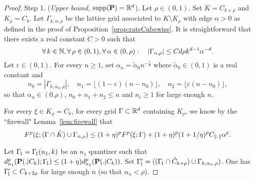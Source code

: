 \begin{proof} {\sc Step 1.}
 ({\em Upper bound}, ${\rm supp}(\mathbf{P})= \mathbb{R}^d$). Let
$\rho\!\in(0,1)$. Set $K=C_{k+\rho}$ and $K_{\rho}= C_k$. Let
$\Gamma_{k,\alpha,\rho}$ be the lattice grid associated to $K\setminus K_{\rho}$
with edge $\alpha>0$ as defined  in the proof of Proposition~\ref{prop:rateCubewise}.
It is straightforward that there exists a real constant $C>0$ such that
\[
\forall\, k\in\mathbb{N}, \forall\, \rho\in(0,1), \forall\,\alpha\in(0,\rho):\quad
|\Gamma_{\alpha,\rho}|\le C d\rho k^{d-1}\alpha^{-d}  .
\] 
Let $\varepsilon\!\in (0,1)$. For every $n\ge 1$, set $\alpha_n = \tilde
\alpha_0 n^{-\frac 1d}$ where $\tilde \alpha_0\in(0,1)$ is a real constant and
\[ 
n_0= |\Gamma_{k,\alpha_n,\rho}|,\quad n_1=\lfloor
(1-\varepsilon)(n-n_0)\rfloor,\quad n_2= \lfloor \varepsilon (n-n_0)\rfloor, 
\]
so that $\alpha_n\in(0.\rho)$, $n_0+n_1+n_2\le n$ and $n_i\ge1$ for large enough
$n$. 

\smallskip For every $\xi\!\in K_{\rho}=C_k$, for every grid $\Gamma\subset
\mathbb{R}^d$ containing $K_{\rho}$, we know by the ``firewall" 
Lemma~\ref{lem:firewall} that
\[ 
F^p(\xi;(\Gamma\cap
\mathring{K})\cup\Gamma_{\alpha,\rho})\le (1+\eta)^p F^p(\xi;\Gamma)
+(1+\eta)^p(1+1/\eta)^pC_{\lVert.\rVert}\alpha^p. 
\]

Let $\Gamma_{\!1}=\Gamma_{\!1}(n_1,k)$ be an $n_1$ quantizer such that
$d^p_{n_1}(\mathbf{P}(.|C_k); \Gamma_{\!1}) \leq (1+\eta) d^p_{n_1}(\mathbf{P}(.|C_k))$.
Set $\Gamma_{\!1}'=((\Gamma_{\!1}\cap \mathring C_{k+\rho})\cup
\Gamma_{k,\alpha_n,\rho})$. One has $\Gamma_{\!1}'\subset C_{k+2\rho}$ for large
enough $n$ (so that $\alpha_n<\rho$).


\end{proof}
